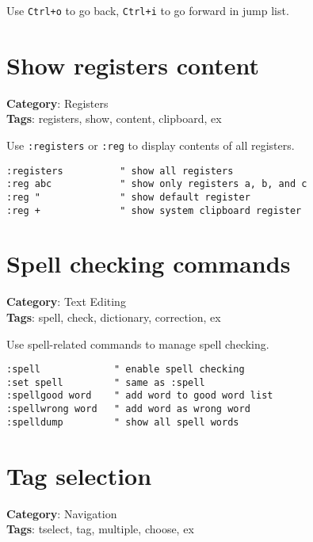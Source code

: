 {{{{{{Use {\footnotesize \Verb§Ctrl+o§} to go back, {\footnotesize \Verb§Ctrl+i§} to go forward in jump list.

\section{Show registers content}

\textbf{Category}: Registers\\ \textbf{Tags}: registers, show, content, clipboard, ex
\vspace{0.5cm}

Use {\footnotesize \Verb§:registers§} or {\footnotesize \Verb§:reg§} to display contents of all registers.

\begin{Exa*}{}
\begin{Verbatim}[fontsize=\footnotesize, breaklines, breakanywhere]
:registers          " show all registers
:reg abc            " show only registers a, b, and c
:reg "              " show default register
:reg +              " show system clipboard register
\end{Verbatim}
\end{Exa*}

\section{Spell checking commands}

\textbf{Category}: Text Editing\\ \textbf{Tags}: spell, check, dictionary, correction, ex
\vspace{0.5cm}

Use spell-related commands to manage spell checking.

\begin{Exa*}{}
\begin{Verbatim}[fontsize=\footnotesize, breaklines, breakanywhere]
:spell             " enable spell checking
:set spell         " same as :spell
:spellgood word    " add word to good word list
:spellwrong word   " add word as wrong word
:spelldump         " show all spell words
\end{Verbatim}
\end{Exa*}

\section{Tag selection}

\textbf{Category}: Navigation\\ \textbf{Tags}: tselect, tag, multiple, choose, ex
\vspace{0.5cm}

}}}}}}
